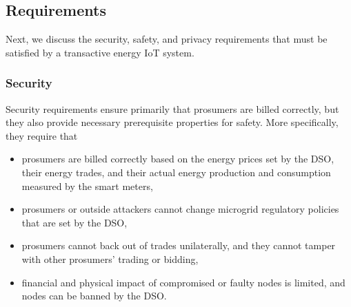 \subsection{Requirements}
Next, we discuss the security, safety, and privacy requirements that must be satisfied by a transactive energy IoT system.

\subsubsection{Security}
Security requirements ensure primarily that prosumers are billed correctly, but they also provide necessary prerequisite properties for safety.
More specifically, they require that 
\begin{itemize}[noitemsep,topsep=-\parskip]
\item prosumers are billed correctly based on the energy prices set by the DSO, their energy trades, and their actual energy production and consumption measured by the smart meters, %
\item prosumers or outside attackers cannot change microgrid regulatory policies that are set by the DSO,
\item prosumers cannot back out of trades unilaterally, and they cannot tamper with other prosumers' trading or bidding,
\item financial and physical impact of compromised or faulty nodes is limited, and nodes can be banned by the DSO.
\end{itemize}

